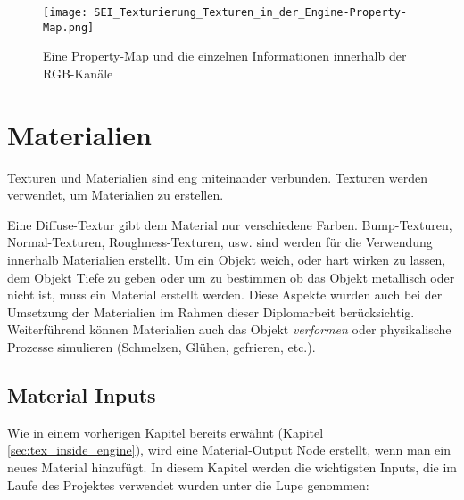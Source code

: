 \begin{figure}[H]
    \centering
    \texttt{[image: SEI\_Texturierung\_Texturen\_in\_der\_Engine-Property-Map.png]}
    \caption{Eine Property-Map und die einzelnen Informationen innerhalb der RGB-Kanäle}
    \label{picture:property_map}
\end{figure}


\section{Materialien}
\label{sec:materials}

Texturen und Materialien sind eng miteinander verbunden. Texturen werden verwendet, um Materialien zu erstellen.

Eine Diffuse-Textur gibt dem Material nur verschiedene Farben. Bump-Texturen, Normal-Texturen, Roughness-Texturen, usw.
sind werden für die Verwendung innerhalb Materialien erstellt. Um ein Objekt weich, oder hart wirken zu lassen, dem
Objekt Tiefe zu geben oder um zu bestimmen ob das Objekt metallisch oder nicht ist, muss ein Material erstellt werden.
Diese Aspekte wurden auch bei der Umsetzung der Materialien im Rahmen dieser Diplomarbeit berücksichtig. Weiterführend
können Materialien auch das Objekt \textit{verformen} oder physikalische Prozesse simulieren (Schmelzen, Glühen,
gefrieren, etc.).

\subsection{Material Inputs}
\label{sec:mat_inputs}

Wie in einem vorherigen Kapitel bereits erwähnt (Kapitel \ref{sec:tex_inside_engine}), wird eine Material-Output Node
erstellt, wenn man ein neues Material hinzufügt. In diesem Kapitel werden die wichtigsten Inputs, die im Laufe des
Projektes verwendet wurden unter die Lupe genommen:

